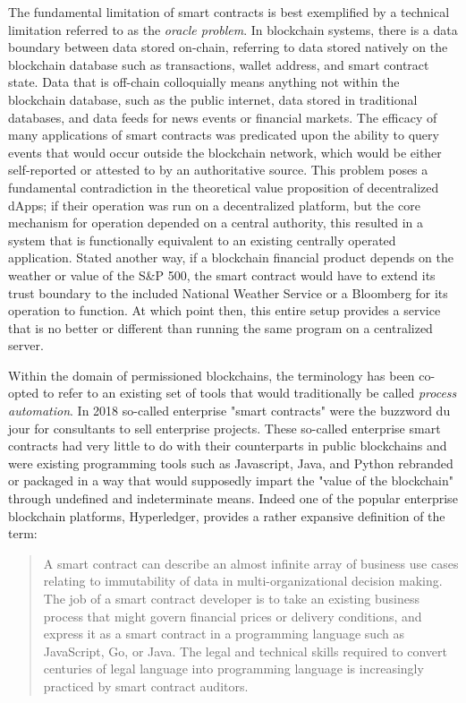 The fundamental limitation of smart contracts is best exemplified by a technical
limitation referred to as the \textit{oracle problem}. In blockchain systems, there is
a data boundary between data stored on-chain, referring to data stored natively
on the blockchain database such as transactions, wallet address, and smart
contract state. Data that is off-chain colloquially means anything not within
the blockchain database, such as the public internet, data stored in traditional
databases, and data feeds for news events or financial markets. The efficacy of
many applications of smart contracts was predicated upon the ability to query
events that would occur outside the blockchain network, which would be either
self-reported or attested to by an authoritative source. This problem poses a
fundamental contradiction in the theoretical value proposition of decentralized
dApps; if their operation was run on a decentralized platform, but the core
mechanism for operation depended on a central authority, this resulted in a
system that is functionally equivalent to an existing centrally operated
application. Stated another way, if a blockchain financial product depends on
the weather or value of the S\&P 500, the smart contract would have to extend its
trust boundary to the included National Weather Service or a Bloomberg for its
operation to function. At which point then, this entire setup provides a service
that is no better or different than running the same program on a centralized
server. \cite{doctorow_inevitability_nodate}


Within the domain of permissioned blockchains, the terminology has been co-opted
to refer to an existing set of tools that would traditionally be called
\textit{process automation}. In 2018 so-called enterprise "smart contracts" were
the buzzword du jour for consultants to sell enterprise projects. These
so-called enterprise smart contracts had very little to do with their
counterparts in public blockchains and were existing programming tools such as
Javascript, Java, and Python rebranded or packaged in a way that would
supposedly impart the "value of the blockchain" through undefined and
indeterminate means. Indeed one of the popular enterprise blockchain platforms,
Hyperledger, provides a rather expansive definition of the term:
\cite{noauthor_hyperledger_2017}

\begin{quote}
A smart contract can describe an almost infinite array of business use
cases relating to immutability of data in multi-organizational decision
making. The job of a smart contract developer is to take an existing
business process that might govern financial prices or delivery
conditions, and express it as a smart contract in a programming language
such as JavaScript, Go, or Java. The legal and technical skills required
to convert centuries of legal language into programming language is
increasingly practiced by smart contract auditors.
\end{quote}

